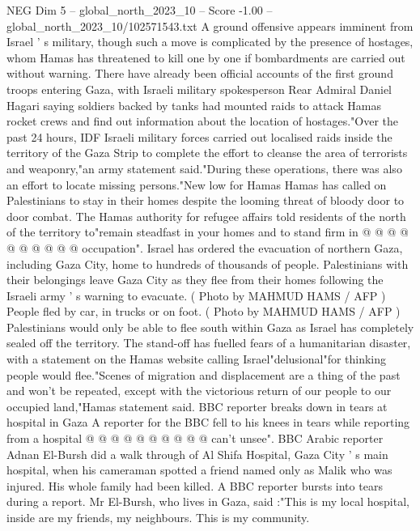 \begin{textsample}{NEG Dim 5 – global\_north\_2023\_10 – Score -1.00 – global\_north\_2023\_10/102571543.txt}  \label{ex:f5_neg_027}
A ground offensive appears imminent from Israel ' s military, though such a move is complicated by the presence of hostages, whom Hamas has threatened to kill one by one if bombardments are carried out without warning.
There have already been official accounts of the first ground troops entering Gaza, with Israeli military spokesperson Rear Admiral Daniel Hagari saying soldiers backed by tanks had mounted raids to attack Hamas rocket crews and find out information about the location of hostages."Over the past 24 hours, IDF Israeli military forces carried out localised raids inside the territory of the Gaza Strip to complete the effort to cleanse the area of terrorists and weaponry,"an army statement said."During these operations, there was also an effort to locate missing persons."New low for Hamas Hamas has called on Palestinians to stay in their homes despite the looming threat of bloody door to door combat.
The Hamas authority for refugee affairs told residents of the north of the territory to"remain steadfast in your homes and to stand firm in @ @ @ @ @ @ @ @ @ @ occupation".
Israel has ordered the evacuation of northern Gaza, including Gaza City, home to hundreds of thousands of people.
Palestinians with their belongings leave Gaza City as they flee from their homes following the Israeli army ' s warning to evacuate. ( Photo by MAHMUD HAMS / AFP ) People fled by car, in trucks or on foot. ( Photo by MAHMUD HAMS / AFP ) Palestinians would only be able to flee south within Gaza as Israel has completely sealed off the territory.
The stand-off has fuelled fears of a humanitarian disaster, with a statement on the Hamas website calling Israel"delusional"for thinking people would flee."Scenes of migration and displacement are a thing of the past and won't be repeated, except with the victorious return of our people to our occupied land,"Hamas statement said.
BBC reporter breaks down in tears at hospital in Gaza A reporter for the BBC fell to his knees in tears while reporting from a hospital @ @ @ @ @ @ @ @ @ @ can't unsee".
BBC Arabic reporter Adnan El-Bursh did a walk through of Al Shifa Hospital, Gaza City ' s main hospital, when his cameraman spotted a friend named only as Malik who was injured.
His whole family had been killed.
A BBC reporter bursts into tears during a report.
Mr El-Bursh, who lives in Gaza, said :"This is my local hospital, inside are my friends, my neighbours.
This is my community.

\end{textsample}
